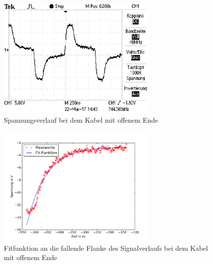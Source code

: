 \clearpage

\begin{figure}
	\centering
	\includegraphics[width=0.7\textwidth]{Laplace/offen.pdf}
	\caption{Spannungsverlauf bei dem Kabel mit offenem Ende}
	\label{fig:oszi_offen}
\end{figure}

\begin{figure}
	\centering
	\includegraphics[width=0.7\textwidth]{Laplace/offenes_ende.pdf}
	\caption{Fitfunktion an die fallende Flanke des Signalverlaufs bei dem Kabel mit offenem Ende}
	\label{fig:fit_offen}
\end{figure}

